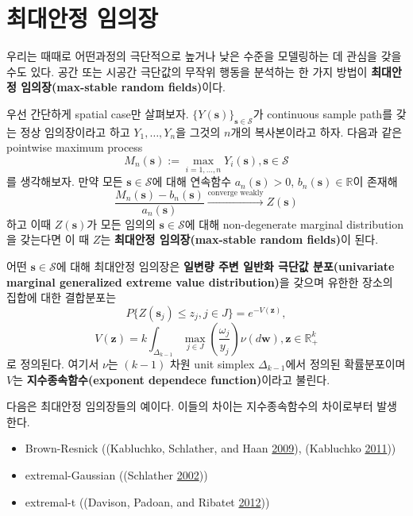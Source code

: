 \documentclass[b5paper,]{book}
\theoremstyle{definition}
\theoremstyle{definition}
\theoremstyle{definition}
\theoremstyle{remark}
\begin{document}
\chapter{최대안정 임의장}\label{maxstableRF}

우리는 때때로 어떤과정의 극단적으로 높거나 낮은 수준을 모델링하는 데
관심을 갖을 수도 있다. 공간 또는 시공간 극단값의 무작위 행동을 분석하는
한 가지 방법이 \textbf{최대안정 임의장(max-stable random fields)}이다.

우선 간단하게 spatial case만 살펴보자.
\(\{Y(\mathbf{s})\}_{\mathbf{s}\in\mathcal{S}}\)가 continuous sample
path를 갖는 정상 임의장이라고 하고 \(Y_{1},\ldots, Y_{n}\)을 그것의
\(n\)개의 복사본이라고 하자. 다음과 같은 pointwise maximum process
\[M_{n}(\mathbf{s}):=\max_{i=1,\ldots,n}Y_{i}(\mathbf{s}), \mathbf{s}\in\mathcal{S}\]
를 생각해보자. 만약 모든 \(\mathbf{s}\in\mathcal{S}\)에 대해 연속함수
\(a_{n}(\mathbf{s})>0\), \(b_{n}(\mathbf{s})\in\mathbb{R}\)이 존재해
\[\frac{M_{n}(\mathbf{s})-b_{n}(\mathbf{s})}{a_{n}(\mathbf{s})} \stackrel{\text{converge weakly}}{\rightarrow}Z(\mathbf{s})\]
하고 이때 \(Z(\mathbf{s})\)가 모든 임의의 \(\mathbf{s}\in\mathcal{S}\)에
대해 non-degenerate marginal distribution을 갖는다면 이 때 \(Z\)는
\textbf{최대안정 임의장(max-stable random fields)}이 된다.

어떤 \(\mathbf{s}\in\mathcal{S}\)에 대해 최대안정 임의장은
\textbf{일변량 주변 일반화 극단값 분포(univariate marginal generalized
extreme value distribution)}을 갖으며 유한한 장소의 집합에 대한
결합분포는
\[P\{Z(\mathbf{s}_{j})\leq z_{j}, j \in J\}=e^{-V(\mathbf{z})},\]
\[V(\mathbf{z})=k\int_{\Delta_{k-1}}\max_{j\in J}(\frac{\omega_{j}}{y_{j}})\nu(d\mathbf{w}), \mathbf{z}\in\mathbb{R}_{+}^{k}\]
로 정의된다. 여기서 \(\nu\)는 \((k-1)\) 차원 unit simplex
\(\Delta_{k-1}\)에서 정의된 확률분포이며 \(V\)는
\textbf{지수종속함수(exponent dependece function)}이라고 불린다.

다음은 최대안정 임의장들의 예이다. 이들의 차이는 지수종속함수의
차이로부터 발생한다.

\begin{itemize}
\item
  Brown-Resnick ((Kabluchko, Schlather, and Haan
  \protect\hyperlink{ref-Kabluchko2009a}{2009}), (Kabluchko
  \protect\hyperlink{ref-Kabluchko2011}{2011}))
\item
  extremal-Gaussian ((Schlather
  \protect\hyperlink{ref-Schlather2002}{2002}))
\item
  extremal-t ((Davison, Padoan, and Ribatet
  \protect\hyperlink{ref-Davison2012}{2012}))
\end{itemize}
\end{document}
